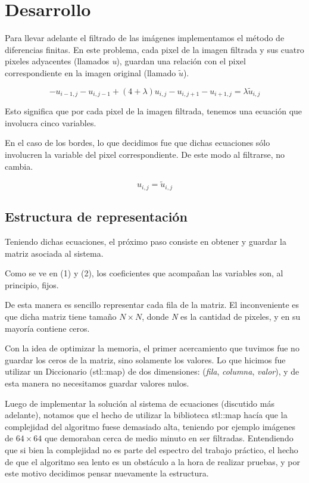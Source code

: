 \documentclass[a4paper]{article}
\begin{document}
\newpage

\section{Desarrollo}

Para llevar adelante el filtrado de las imágenes implementamos el método de diferencias finitas.
En este problema, cada pixel de la imagen filtrada y sus cuatro pixeles adyacentes (llamados \textit{u}), guardan una relación con el pixel correspondiente en la imagen original (llamado $\tilde{u}$).

\begin{equation}
 -u_{i - 1, j} - u_{i, j - 1} + (4 + \lambda ) u_{i,j} - u_{i, j + 1} - u_{i + 1, j} = \lambda \tilde{u}_{i,j}
 \label{eqs}
\end{equation}

Esto significa que por cada pixel de la imagen filtrada, tenemos una ecuación que involucra cinco variables.

En el caso de los bordes, lo que decidimos fue que dichas ecuaciones sólo involucren la variable del pixel correspondiente. De este modo al filtrarse, no cambia.

\begin{equation}
u_{i,j} = \tilde{u}_{i,j}
\end{equation}

\subsection{Estructura de representación}

Teniendo dichas ecuaciones, el próximo paso consiste en obtener y guardar la matriz asociada al sistema.

Como se ve en (1) y (2), los coeficientes que acompañan las variables son, al principio, fijos.

De esta manera es sencillo representar cada fila de la matriz. El inconveniente es que dicha matriz tiene tamaño $N \times N$, donde \textit{N} es la cantidad de pixeles, y en su mayoría contiene ceros.

Con la idea de optimizar la memoria, el primer acercamiento que tuvimos fue no guardar los ceros de la matriz, sino solamente los valores. Lo que hicimos fue utilizar un Diccionario (stl::map) de dos dimensiones: (\textit{fila}, \textit{columna}, \textit{valor}), y de esta manera no necesitamos guardar valores nulos.

Luego de implementar la solución al sistema de ecuaciones (discutido más adelante), notamos que el hecho de utilizar la biblioteca stl::map hacía que la complejidad del algoritmo fuese demasiado alta, teniendo por ejemplo imágenes de $64 \times 64$ que demoraban cerca de medio minuto en ser filtradas. Entendiendo que si bien la complejidad no es parte del espectro del trabajo práctico, el hecho de que el algoritmo sea lento es un obstáculo a la hora de realizar pruebas, y por este motivo decidimos pensar nuevamente la estructura.
\end{document}
